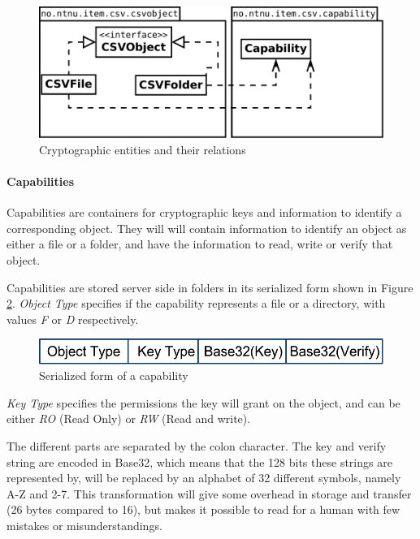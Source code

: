 \documentclass[pdftex,english,10pt,b5paper,twoside]{book}
\begin{document}
\begin{figure}[h!]
    \centering
    \includegraphics[scale=0.4]{csvobjects.pdf}
    \caption{Cryptographic entities and their relations}
    \label{fig:CSVlib:overview}
\end{figure}

\paragraph{Capabilities} Capabilities are containers for
cryptographic keys and information to identify a corresponding object. They
will will contain information to identify an object as either a file or a
folder, and have the information to read, write or verify that object.

Capabilities are stored server side in folders in its serialized form shown
in Figure \ref{fig:CAP:serial}. \emph{Object Type} specifies if the capability
represents a file or a directory, with values \emph{F} or \emph{D}
respectively.

\begin{figure}[h!]
    \centering
    \includegraphics[scale=0.6]{CapabilitySerialization.pdf}
    \caption{Serialized form of a capability}
    \label{fig:CAP:serial}
\end{figure}

\emph{Key Type} specifies the permissions the key will grant on the object, and
can be either \emph{RO} (Read Only) or \emph{RW} (Read and write).

The different parts are separated by the colon character. The key and
verify string are encoded in Base32, which means that the 128 bits these
strings are represented by, will be replaced by an alphabet of 32 different
symbols, namely A-Z and 2-7. This transformation will give some overhead in
storage and transfer (26 bytes compared to 16), but makes it possible to read for a human
with few mistakes or misunderstandings.
\end{document}
